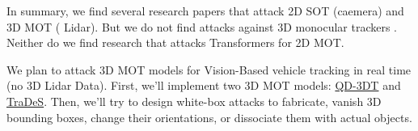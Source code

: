 In summary, we find several research papers that attack 2D SOT (caemera) and 3D MOT ( Lidar). But we do not find attacks against 3D monocular trackers \cite{wu2021track} \cite{hu2022monocular}. Neither do we find research that attacks Transformers for 2D MOT.

We plan to attack 3D MOT models for Vision-Based vehicle tracking in real time (no 3D Lidar Data). First, we'll implement two 3D MOT models: \href{https://github.com/SysCV/qd-3dt}{QD-3DT} and \href{https://github.com/JialianW/TraDeS}{TraDeS}. Then, we'll try to design white-box attacks to fabricate, vanish 3D bounding boxes, change their orientations, or dissociate them with actual objects.





